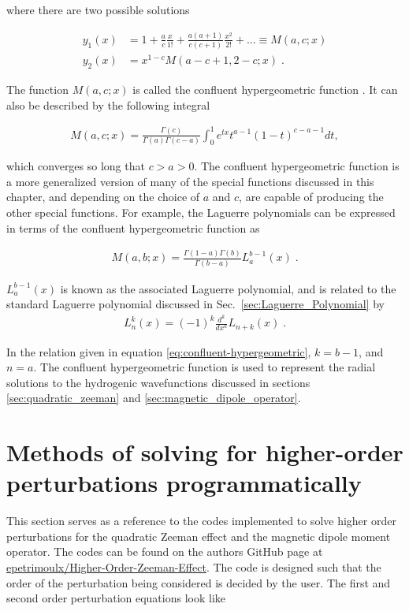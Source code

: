         \noindent where there are two possible solutions 

        \begin{align}
            y_1(x) &= 1 + \frac{a}{c} \frac{x}{1!} + \frac{a(a+1)}{c(c+1)}\frac{x^2}{2!} + \dots \equiv M(a, c ;x)\\
            y_2(x) &= x^{1-c}M(a-c + 1, 2 - c; x)\;.
        \end{align}

        \noindent The function $M(a, c;x)$ is called the confluent hypergeometric function \cite{Riley_Hobson_Bence_2006}. It can also be described by the following integral 

        \begin{align}
            M(a, c; x) = \frac{\Gamma(c)}{\Gamma(a)\Gamma(c - a)} \int_0^1 e^{tx} t^{a-1} (1 - t)^{c - a - 1} dt,
        \end{align}

        \noindent which converges so long that $c > a > 0$. The confluent hypergeometric function is a more generalized version of many of the special functions discussed in this chapter, and depending on the choice of $a$ and $c$, are capable of producing the other special functions. For example, the Laguerre polynomials can be expressed in terms of the confluent hypergeometric function as 

        \begin{align}
            M(a, b; x) = \frac{\Gamma(1 - a) \Gamma(b)}{\Gamma(b - a)} L_a^{b-1}(x)\;. \label{eq:confluent-hypergeometric}
        \end{align}

        \noindent $L_a^{b-1}(x)$ is known as the associated Laguerre polynomial, and is related to the standard Laguerre polynomial discussed in Sec.~\ref{sec:Laguerre_Polynomial} by 
        \begin{align}
            L_n^k(x) = (-1)^k \frac{d^k}{dx^k} L_{n+k}(x)\;.
        \end{align}

        \noindent In the relation given in equation \eqref{eq:confluent-hypergeometric}, $k = {b-1}$, and $n = a$. The confluent hypergeometric function is used to represent the radial solutions to the hydrogenic wavefunctions discussed in sections \ref{sec:quadratic_zeeman} and \ref{sec:magnetic_dipole_operator}.


\chapter{Methods of solving for higher-order perturbations programmatically} \label{sec:Program_perturbation}
    This section serves as a reference to the codes implemented to solve higher order perturbations for the quadratic Zeeman effect and the magnetic dipole moment operator. The codes can be found on the authors GitHub page at \href{https://github.com/epetrimoulx/Quadratic-Zeeman-Effect}{epetrimoulx/Higher-Order-Zeeman-Effect}. The code is designed such that the order of the perturbation being considered is decided by the user. The first and second order perturbation equations look like 

